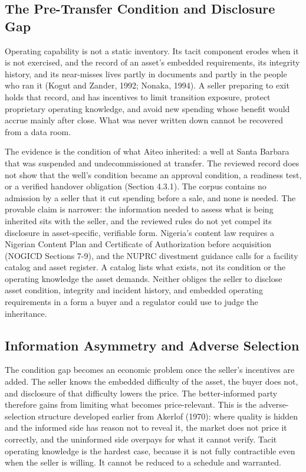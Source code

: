 \hypertarget{the-pre-transfer-condition-and-disclosure-gap}{%
\subsection{The Pre-Transfer Condition and Disclosure
Gap}\label{the-pre-transfer-condition-and-disclosure-gap}}

Operating capability is not a static inventory. Its tacit component
erodes when it is not exercised, and the record of an asset's embedded
requirements, its integrity history, and its near-misses lives partly in
documents and partly in the people who ran it (Kogut and Zander, 1992;
Nonaka, 1994). A seller preparing to exit holds that record, and has
incentives to limit transition exposure, protect proprietary operating
knowledge, and avoid new spending whose benefit would accrue mainly
after close. What was never written down cannot be recovered from a data
room.

The evidence is the condition of what Aiteo inherited: a well at Santa
Barbara that was suspended and undecommissioned at transfer. The
reviewed record does not show that the well's condition became an
approval condition, a readiness test, or a verified handover obligation
(Section 4.3.1). The corpus contains no admission by a seller that it
cut spending before a sale, and none is needed. The provable claim is
narrower: the information needed to assess what is being inherited sits
with the seller, and the reviewed rules do not yet compel its disclosure
in asset-specific, verifiable form. Nigeria's content law requires a
Nigerian Content Plan and Certificate of Authorization before
acquisition (NOGICD Sections 7-9), and the NUPRC divestment guidance
calls for a facility catalog and asset register. A catalog lists what
exists, not its condition or the operating knowledge the asset demands.
Neither obliges the seller to disclose asset condition, integrity and
incident history, and embedded operating requirements in a form a buyer
and a regulator could use to judge the inheritance.

\hypertarget{information-asymmetry-and-adverse-selection}{%
\subsection{Information Asymmetry and Adverse
Selection}\label{information-asymmetry-and-adverse-selection}}

The condition gap becomes an economic problem once the seller's
incentives are added. The seller knows the embedded difficulty of the
asset, the buyer does not, and disclosure of that difficulty lowers the
price. The better-informed party therefore gains from limiting what
becomes price-relevant. This is the adverse-selection structure
developed earlier from Akerlof (1970): where quality is hidden and the
informed side has reason not to reveal it, the market does not price it
correctly, and the uninformed side overpays for what it cannot verify.
Tacit operating knowledge is the hardest case, because it is not fully
contractible even when the seller is willing. It cannot be reduced to a
schedule and warranted.

